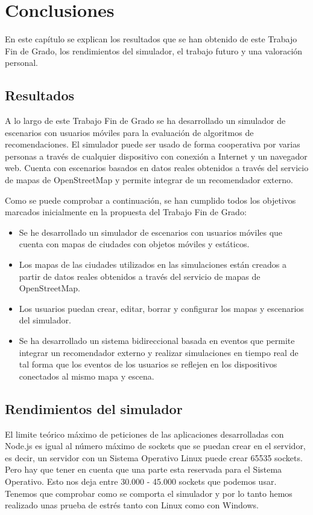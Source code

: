 \chapter{Conclusiones}

En este capítulo se explican los resultados que se han obtenido de este Trabajo Fin de Grado, los rendimientos del simulador, el trabajo futuro y una valoración personal.

\section{Resultados}

A lo largo de este Trabajo Fin de Grado se ha desarrollado un simulador de escenarios con usuarios móviles para la evaluación de algoritmos de recomendaciones. El simulador puede ser usado de forma cooperativa por varias personas a través de cualquier dispositivo con conexión a Internet y un navegador web. Cuenta con escenarios basados en datos reales obtenidos a través del servicio de mapas de OpenStreetMap y permite integrar de un recomendador externo.

Como se puede comprobar a continuación, se han cumplido todos los objetivos marcados inicialmente en la propuesta del Trabajo Fin de Grado:
\begin{itemize}
	\item Se he desarrollado un simulador de escenarios con usuarios móviles que cuenta con mapas de ciudades con objetos móviles y estáticos.
	\item Los mapas de las ciudades utilizados en las simulaciones están creados a partir de datos reales obtenidos a través del servicio de mapas de OpenStreetMap.
	\item Los usuarios puedan crear, editar, borrar y configurar los mapas y escenarios del simulador.
	\item Se ha desarrollado un sistema bidireccional basada en eventos que permite integrar un recomendador externo y realizar simulaciones en tiempo real de tal forma que los eventos de los usuarios se reflejen en los dispositivos conectados al mismo mapa y escena.
\end{itemize}

\section{Rendimientos del simulador}

El limite teórico máximo de peticiones de las aplicaciones desarrolladas con Node.js es igual al número máximo de sockets que se puedan crear en el servidor, es decir, un servidor con un Sistema Operativo Linux puede crear 65535 sockets. Pero hay que tener en cuenta que una parte esta reservada para el Sistema Operativo. Esto nos deja entre 30.000 - 45.000 sockets que podemos usar. Tenemos que comprobar como se comporta el simulador y por lo tanto hemos realizado unas prueba de estrés tanto con Linux como con Windows.


